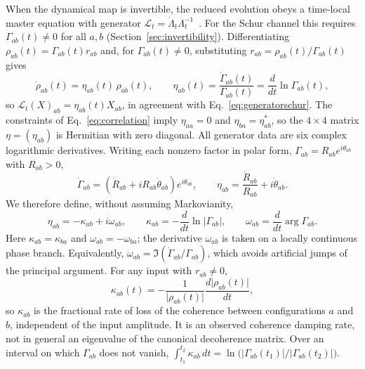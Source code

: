 \documentclass[11pt,a4paper]{article}
\begin{document}
When the dynamical map is invertible, the reduced evolution obeys a
time-local master equation with generator
$\mathcal L_t=\dot\Lambda_t\Lambda_t^{-1}$~\cite{Hall2014}. For the
Schur channel this requires $\Gamma_{ab}(t)\ne0$ for all $a,b$
(Section~\ref{sec:invertibility}). Differentiating
$\rho_{ab}(t)=\Gamma_{ab}(t)r_{ab}$ and, for $\Gamma_{ab}(t)\ne0$,
substituting $r_{ab}=\rho_{ab}(t)/\Gamma_{ab}(t)$ gives
\begin{equation}
 \dot\rho_{ab}(t)=\eta_{ab}(t)\,\rho_{ab}(t),\qquad
 \eta_{ab}(t)=\frac{\dot\Gamma_{ab}(t)}{\Gamma_{ab}(t)}
 =\frac{d}{dt}\ln\Gamma_{ab}(t),
 \label{eq:schurgenerator}
\end{equation}
so $\mathcal L_t(X)_{ab}=\eta_{ab}(t)X_{ab}$, in agreement with
Eq.~\eqref{eq:generatorschur}. The constraints of
Eq.~\eqref{eq:correlation} imply $\eta_{aa}=0$ and
$\eta_{ba}=\eta_{ab}^*$, so the $4\times4$ matrix $\eta=(\eta_{ab})$ is
Hermitian with zero diagonal. All generator data are six complex
logarithmic derivatives. Writing each nonzero factor in polar form,
$\Gamma_{ab}=R_{ab}e^{i\theta_{ab}}$ with $R_{ab}>0$,
\begin{equation}
 \dot\Gamma_{ab}=(\dot R_{ab}+iR_{ab}\dot\theta_{ab})e^{i\theta_{ab}},\qquad
 \eta_{ab}=\frac{\dot R_{ab}}{R_{ab}}+i\dot\theta_{ab}.
\end{equation}
We therefore define, without assuming Markovianity,
\begin{equation}
 \eta_{ab}=-\kappa_{ab}+i\omega_{ab},\qquad
 \kappa_{ab}=-\frac{d}{dt}\ln\lvert\Gamma_{ab}\rvert,\qquad
 \omega_{ab}=\frac{d}{dt}\arg\Gamma_{ab}.
 \label{eq:kappaomega}
\end{equation}
Here $\kappa_{ab}=\kappa_{ba}$ and $\omega_{ab}=-\omega_{ba}$; the
derivative $\omega_{ab}$ is taken on a locally continuous phase branch.
Equivalently, $\omega_{ab}=\Im(\dot\Gamma_{ab}/\Gamma_{ab})$, which
avoids artificial jumps of the principal argument.
For any input with $r_{ab}\ne0$,
\begin{equation}
 \kappa_{ab}(t)=-\frac{1}{\lvert\rho_{ab}(t)\rvert}
 \frac{d\lvert\rho_{ab}(t)\rvert}{dt},
 \label{eq:fractionalrate}
\end{equation}
so $\kappa_{ab}$ is the fractional rate of loss of the coherence
between configurations $a$ and $b$, independent of the input amplitude.
It is an observed coherence damping rate, not in general an eigenvalue
of the canonical decoherence matrix.
Over an interval on which $\Gamma_{ab}$ does not vanish,
$\int_{t_1}^{t_2}\kappa_{ab}\,dt=\ln\bigl(\lvert\Gamma_{ab}(t_1)\rvert
/\lvert\Gamma_{ab}(t_2)\rvert\bigr)$.
\end{document}
